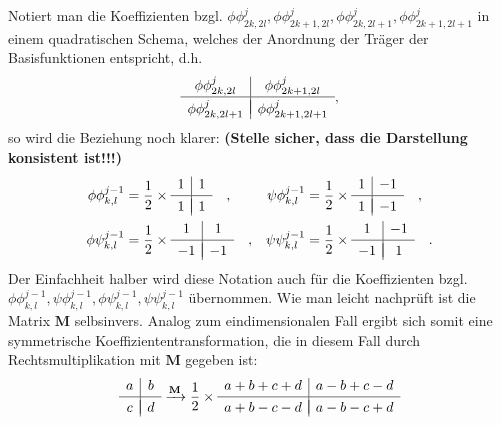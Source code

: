 %
Notiert man die Koeffizienten bzgl. $\phi\phi_{2k,2l}^{j}, \phi\phi_{2k+1,2l}^{j}, \phi\phi_{2k,2l+1}^{j}, \phi\phi_{2k+1,2l+1}^{j}$ in einem quadratischen Schema, welches der Anordnung der Träger der Basisfunktionen entspricht, d.h.
%
\[
\begin{array}{c|c}
\phi\phi_{2k,2l}^{j} & \phi\phi_{2k+1,2l}^{j} \\[.05cm] 
\hline \\[-0.35cm]
\phi\phi_{2k,2l+1}^{j} & \phi\phi_{2k+1,2l+1}^{j}
\end{array}
,
\]
%
so wird die Beziehung noch klarer: \textbf{(Stelle sicher, dass die Darstellung konsistent ist!!!)}
%
\begin{align*}
\phi\phi_{k,l}^{j-1} &=
\frac{1}{2} \times
\begin{array}{c|c}
1 & 1 \\[.05cm] 
\hline \\[-0.35cm]
1 & 1
\end{array}
\quad , &
\psi\phi_{k,l}^{j-1} &=
\frac{1}{2} \times
\begin{array}{c|c}
1 & -1 \\[.05cm] 
\hline \\[-0.35cm]
1 & -1
\end{array}
\quad , \\
\phi\psi_{k,l}^{j-1} &=
\frac{1}{2} \times
\begin{array}{c|c}
1 & 1 \\[.05cm] 
\hline \\[-0.35cm]
-1 & -1
\end{array}
\quad , &
\psi\psi_{k,l}^{j-1} &=
\frac{1}{2} \times
\begin{array}{c|c}
1 & -1 \\[.05cm] 
\hline \\[-0.35cm]
-1 & 1
\end{array}
\quad .
\end{align*}
%
Der Einfachheit halber wird diese Notation auch für die Koeffizienten bzgl. $\phi\phi_{k,l}^{j-1}, \psi\phi_{k,l}^{j-1}, \phi\psi_{k,l}^{j-1}, \psi\psi_{k,l}^{j-1}$ übernommen.
%
Wie man leicht nachprüft ist die Matrix $\mathbf{M}$ selbsinvers. Analog zum eindimensionalen Fall ergibt sich somit eine symmetrische Koeffiziententransformation, die in diesem Fall durch Rechtsmultiplikation mit $\mathbf{M}$ gegeben ist:
%
\[
\begin{array}{c|c}
a & b \\[.05cm] 
\hline \\[-0.35cm]
c & d
\end{array}
\xrightarrow[]{\mathbf{M}}
\frac{1}{2} \times
\begin{array}{c|c}
a+b+c+d & a-b+c-d \\[.05cm] 
\hline \\[-0.35cm]
a+b-c-d & a-b-c+d
\end{array}
\]
